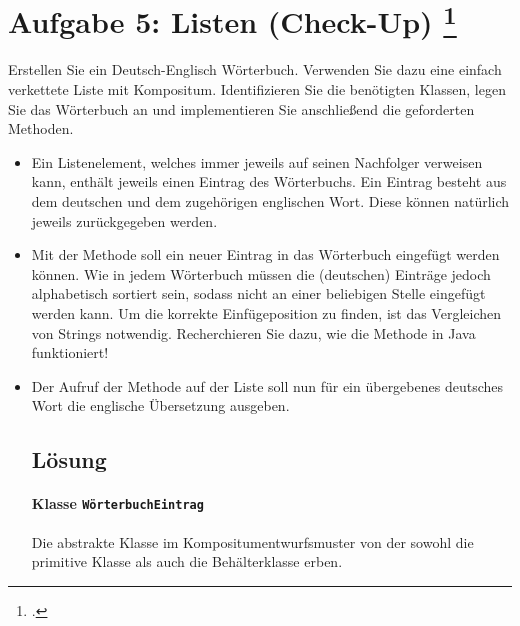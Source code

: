 \documentclass{lehramt-informatik-aufgabe}
\begin{document}

\section{Aufgabe 5: Listen (Check-Up)
\footcite[Seite 4, Aufgabe 5]{aud:ab:5}
}

Erstellen Sie ein Deutsch-Englisch Wörterbuch. Verwenden Sie dazu eine
einfach verkettete Liste mit Kompositum. Identifizieren Sie die
benötigten Klassen, legen Sie das Wörterbuch an und implementieren Sie
anschließend die geforderten Methoden.

\begin{itemize}
\item Ein Listenelement, welches immer jeweils auf seinen Nachfolger
verweisen kann, enthält jeweils einen Eintrag des Wörterbuchs. Ein
Eintrag besteht aus dem deutschen und dem zugehörigen englischen Wort.
Diese können natürlich jeweils zurückgegeben werden.

\item Mit der Methode 
soll ein neuer Eintrag in das Wörterbuch eingefügt werden können. Wie in
jedem Wörterbuch müssen die (deutschen) Einträge jedoch alphabetisch
sortiert sein, sodass nicht an einer beliebigen Stelle eingefügt werden
kann. Um die korrekte Einfügeposition zu finden, ist das Vergleichen von
Strings notwendig. Recherchieren Sie dazu, wie die Methode
 in Java funktioniert!

\item Der Aufruf der Methode  auf der
Liste soll nun für ein übergebenes deutsches Wort die englische
Übersetzung ausgeben.

%

\subsection{Lösung}

\paragraph{Klasse \texttt{WörterbuchEintrag}}

Die abstrakte Klasse im Kompositumentwurfsmuster von der sowohl die
primitive Klasse als auch die Behälterklasse erben.

\begin{antwort}
\end{antwort}


\end{itemize}
\end{document}
